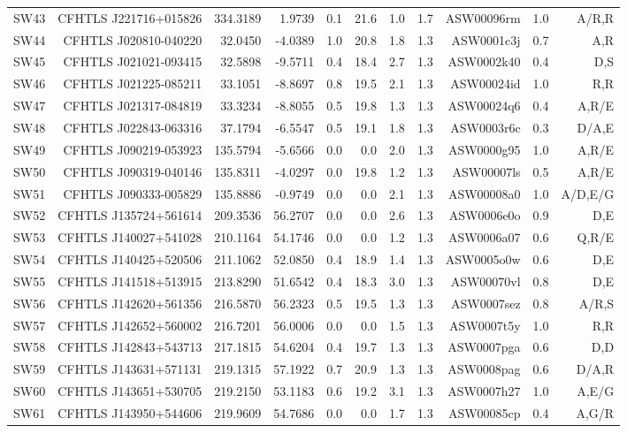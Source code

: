 \documentclass[useAMS,usenatbib,a4paper]{mn2e}
\begin{document}
\begin{center}
\begin{longtable}{lrrrrrrrrrr}
SW43 & CFHTLS J221716+015826 &  334.3189 &    1.9739 &  0.1 & 21.6 &  1.0 &  1.7 & ASW00096rm &  1.0  &  A/R,R   \\ 
SW44 & CFHTLS J020810-040220 &   32.0450 &   -4.0389 &  1.0 & 20.8 &  1.8 &  1.3 & ASW0001c3j &  0.7  &  A,R   \\ 
SW45 & CFHTLS J021021-093415 &   32.5898 &   -9.5711 &  0.4 & 18.4 &  2.7 &  1.3 & ASW0002k40 &  0.4  &  D,S   \\ 
SW46 & CFHTLS J021225-085211 &   33.1051 &   -8.8697 &  0.8 & 19.5 &  2.1 &  1.3 & ASW00024id &  1.0  &  R,R   \\ 
SW47 & CFHTLS J021317-084819 &   33.3234 &   -8.8055 &  0.5 & 19.8 &  1.3 &  1.3 & ASW00024q6 &  0.4  &  A,R/E   \\ 
SW48 & CFHTLS J022843-063316 &   37.1794 &   -6.5547 &  0.5 & 19.1 &  1.8 &  1.3 & ASW0003r6c &  0.3  &  D/A,E   \\ 
SW49 & CFHTLS J090219-053923 &  135.5794 &   -5.6566 &  0.0 &  0.0 &  2.0 &  1.3 & ASW0000g95 &  1.0  &  A,R/E   \\ 
SW50 & CFHTLS J090319-040146 &  135.8311 &   -4.0297 &  0.0 & 19.8 &  1.2 &  1.3 & ASW00007ls &  0.5  &  A,R/E   \\ 
SW51 & CFHTLS J090333-005829 &  135.8886 &   -0.9749 &  0.0 &  0.0 &  2.1 &  1.3 & ASW00008a0 &  1.0  &  A/D,E/G   \\ 
SW52 & CFHTLS J135724+561614 &  209.3536 &   56.2707 &  0.0 &  0.0 &  2.6 &  1.3 & ASW0006e0o &  0.9  &  D,E   \\ 
SW53 & CFHTLS J140027+541028 &  210.1164 &   54.1746 &  0.0 &  0.0 &  1.2 &  1.3 & ASW0006a07 &  0.6  &  Q,R/E   \\ 
SW54 & CFHTLS J140425+520506 &  211.1062 &   52.0850 &  0.4 & 18.9 &  1.4 &  1.3 & ASW0005o0w &  0.6  &  D,E   \\ 
SW55 & CFHTLS J141518+513915 &  213.8290 &   51.6542 &  0.4 & 18.3 &  3.0 &  1.3 & ASW00070vl &  0.8  &  D,E   \\ 
SW56 & CFHTLS J142620+561356 &  216.5870 &   56.2323 &  0.5 & 19.5 &  1.3 &  1.3 & ASW0007sez &  0.8  &  A/R,S   \\ 
SW57 & CFHTLS J142652+560002 &  216.7201 &   56.0006 &  0.0 &  0.0 &  1.5 &  1.3 & ASW0007t5y &  1.0  &  R,R   \\ 
SW58 & CFHTLS J142843+543713 &  217.1815 &   54.6204 &  0.4 & 19.7 &  1.3 &  1.3 & ASW0007pga &  0.6  &  D,D   \\ 
SW59 & CFHTLS J143631+571131 &  219.1315 &   57.1922 &  0.7 & 20.9 &  1.3 &  1.3 & ASW0008pag &  0.6  &  D/A,R   \\ 
SW60 & CFHTLS J143651+530705 &  219.2150 &   53.1183 &  0.6 & 19.2 &  3.1 &  1.3 & ASW0007h27 &  1.0  &  A,E/G   \\ 
SW61 & CFHTLS J143950+544606 &  219.9609 &   54.7686 &  0.0 &  0.0 &  1.7 &  1.3 & ASW00085cp &  0.4  &  A,G/R   \\ 
\end{longtable}
\end{center}
\end{document}

